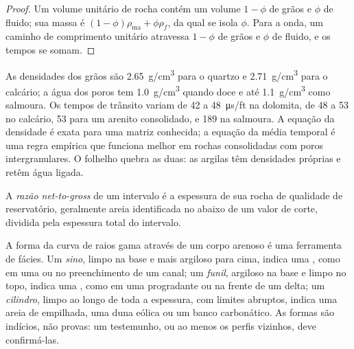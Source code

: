 \begin{proof}
Um volume unitário de rocha contém um volume $1 - \phi$ de grãos e $\phi$ de
fluido; sua massa é $(1 - \phi)\rho_{\mathrm{ma}} + \phi\rho_f$, da qual se
isola $\phi$. Para a onda, um caminho de comprimento unitário atravessa $1 - \phi$ de
grãos e $\phi$ de fluido, e os tempos se somam.
\end{proof}

As densidades dos grãos são \qty{2.65}{g/cm^3} para o quartzo e \qty{2.71}{g/cm^3} para
o calcário; a água dos poros tem \qty{1.0}{g/cm^3} quando doce e até
\qty{1.1}{g/cm^3} como salmoura. Os tempos de trânsito variam de 42 a
\qty{48}{\micro\second/ft} na dolomita, de 48 a 53 no calcário, 53 para um
arenito consolidado, e 189 na salmoura. A equação da densidade é exata para
uma matriz conhecida; a equação da média temporal é uma regra empírica que funciona
melhor em rochas consolidadas com poros intergranulares. O folhelho quebra as duas:
as argilas têm densidades próprias e retêm água ligada.

\begin{definition}\label{def:b3:facies-models:ntg}
A \emph{razão net-to-gross} de um intervalo é a
espessura de sua rocha de qualidade de reservatório, geralmente areia identificada
no  abaixo de um valor de corte, dividida pela espessura total do intervalo.
\end{definition}

A forma da curva de raios gama através de um corpo arenoso é uma ferramenta de fácies.
Um \emph{sino}, limpo na base e mais argiloso para cima, indica uma
, como em uma 
ou no preenchimento de um canal; um \emph{funil}, argiloso na base e limpo no topo,
indica uma , como em uma 
progradante ou na frente de um delta; um \emph{cilindro}, limpo ao longo de toda a espessura,
com limites abruptos, indica uma areia de  empilhada, uma duna eólica
ou um banco carbonático. As formas são indícios, não provas: um testemunho, ou ao menos os perfis vizinhos, deve confirmá-las.

